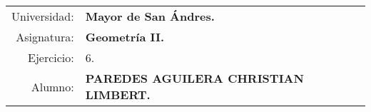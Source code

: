 \begin{tabular}{r l }
Universidad: & \textbf{Mayor de San Ándres.}\\
Asignatura: & \textbf{Geometría II.}\\
Ejercicio: & 6.\\ 
Alumno: & \textbf{PAREDES AGUILERA CHRISTIAN LIMBERT.}
\end{tabular}
\begin{flushleft}
\end{flushleft}
\vspace{.2cm}
